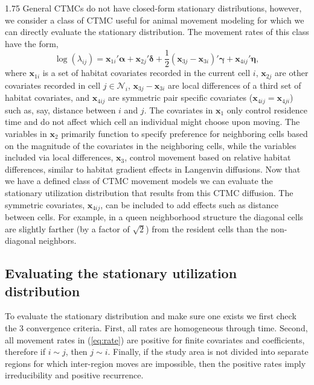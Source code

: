 \documentclass[12pt]{article}
\newcommand{\bx}{\ensuremath{\mathbf{x}}}
\newcommand{\bg}{\ensuremath{\boldsymbol{\gamma}}}
\newcommand{\ba}{\ensuremath{\boldsymbol{\alpha}}}
\newcommand{\bd}{\ensuremath{\boldsymbol{\delta}}}
\newcommand{\bn}{\ensuremath{\boldsymbol{\eta}}}
\newcommand{\fN}{\ensuremath{\mathcal{N}}}
\begin{document}
\begin{spacing}{1.75}
General CTMCs do not have closed-form stationary distributions, however, we consider a class of CTMC useful for animal movement modeling for which we can directly evaluate the stationary distribution. The movement rates of this class have the form, 
\begin{equation}
\label{eq:rate}
\log(\lambda_{ij}) = \bx_{1i}'\ba + \bx_{2j}'\bd + \frac{1}{2}(\bx_{3j}-\bx_{3i})'\bg + \bx_{4ij}'\bn,
\end{equation}
where $\bx_{1i}$ is a set of habitat covariates recorded in the current cell $i$, $\bx_{2j}$ are other covariates recorded in cell $j \in \fN_i$, $\bx_{3j}-\bx_{3i}$ are local differences of a third set of habitat covariates, and $\bx_{4ij}$ are symmetric pair specific covariates ($\bx_{4ij}=\bx_{4ji}$) such as, say, distance between $i$ and $j$. The covariates in $\bx_1$ only control residence time and do not affect which cell an individual might choose upon moving. The variables in $\bx_2$ primarily function to specify preference for neighboring cells based on the magnitude of the covariates in the neighboring cells, while the variables included via local differences, $\bx_3$, control movement based on relative habitat differences, similar to habitat gradient effects in Langenvin diffusions. Now that we have a defined class of CTMC movement models we can evaluate the stationary utilization distribution that results from this CTMC diffusion. The symmetric covariates, $\bx_{4ij}$, can be included to add effects such as distance between cells. For example, in a queen neighborhood structure the diagonal cells are slightly farther (by a factor of $\sqrt{2}$) from the resident cells than the non-diagonal neighbors. 

\subsection{Evaluating the stationary utilization distribution}

To evaluate the stationary distribution and make sure one exists we first check the 3 convergence criteria. First, all rates are homogeneous through time. Second, all movement rates in (\ref{eq:rate}) are positive for finite covariates and coefficients, therefore if $i\sim j$, then $j \sim i$. Finally, if the study area is not divided into separate regions for which inter-region moves are impossible, then the positive rates imply irreducibility and positive recurrence. 


\end{spacing}
\end{document}
